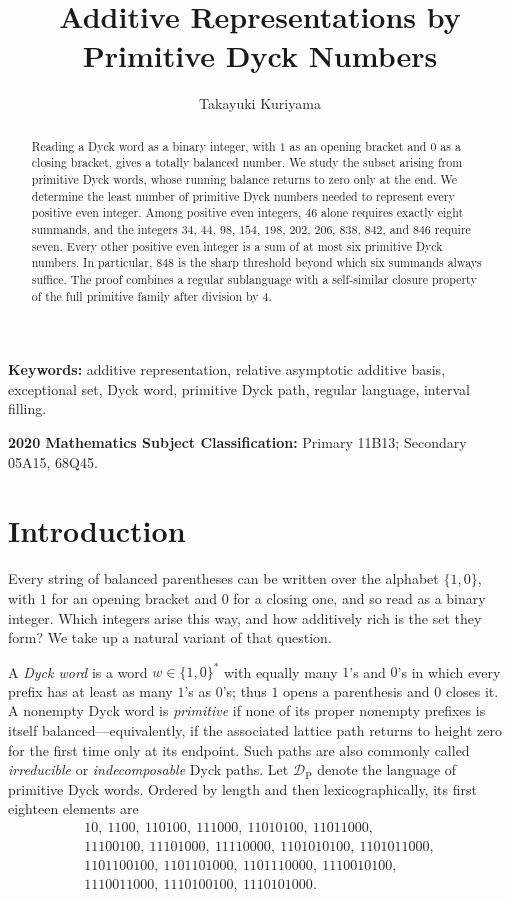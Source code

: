 \documentclass[12pt]{article}
\title{Additive Representations by Primitive Dyck Numbers}
\author{Takayuki Kuriyama}
\date{}
\theoremstyle{plain}
\newcommand{\DP}{\mathcal{D}_{\mathrm{P}}}
\begin{document}
\maketitle

\begin{abstract}
Reading a Dyck word as a binary integer, with $1$ as an opening bracket
and $0$ as a closing bracket, gives a totally balanced number.  We study
the subset arising from primitive Dyck words, whose running balance
returns to zero only at the end.  We determine the least number of
primitive Dyck numbers needed to represent every positive even integer.
Among positive even integers, $46$ alone requires exactly eight summands,
and the integers
$34$, $44$, $98$, $154$, $198$, $202$, $206$, $838$, $842$, and $846$
require seven.  Every other positive even integer is a sum of at most
six primitive Dyck numbers.  In particular, $848$ is the sharp threshold
beyond which six summands always suffice.  The proof combines a regular
sublanguage with a self-similar closure property of the full primitive
family after division by $4$.
\end{abstract}

\noindent\textbf{Keywords:} additive representation, relative asymptotic
additive basis, exceptional set, Dyck word, primitive Dyck path, regular
language, interval filling.

\noindent\textbf{2020 Mathematics Subject Classification:} Primary 11B13;
Secondary 05A15, 68Q45.

\section{Introduction}\label{sec:introduction}

Every string of balanced parentheses can be written over the alphabet
$\{1,0\}$, with $1$ for an opening bracket and $0$ for a closing one,
and so read as a binary integer.  Which integers arise this way, and how
additively rich is the set they form?  We take up a natural variant of
that question.

A \emph{Dyck word} is a word $w\in\{1,0\}^*$ with equally many $1$'s
and $0$'s in which every prefix has at least as many $1$'s as $0$'s;
thus $1$ opens a parenthesis and $0$ closes it.  A nonempty Dyck word is
\emph{primitive} if none of its proper nonempty prefixes is itself
balanced---equivalently, if the associated lattice path returns to
height zero for the first time only at its endpoint.  Such paths are
also commonly called \emph{irreducible} or \emph{indecomposable} Dyck
paths.  Let $\DP$ denote the language
of primitive Dyck words.  Ordered by length and then lexicographically,
its first eighteen elements are
\[
\begin{gathered}
10,\ 1100,\ 110100,\ 111000,\ 11010100,\ 11011000,\\
11100100,\ 11101000,\ 11110000,\ 1101010100,\ 1101011000,\\
1101100100,\ 1101101000,\ 1101110000,\ 1110010100,\\
1110011000,\ 1110100100,\ 1110101000.
\end{gathered}
\]
\end{document}
